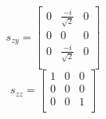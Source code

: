\documentclass[12pt]{article}
\begin{document}
\begin{equation}
s_{zy} = 
\begin{bmatrix}
0     &  \frac{-i}{\sqrt{2}} & 0 \\ 
0     & 0                    & 0 \\
0     &  \frac{-i}{\sqrt{2}} & 0 \\
\end{bmatrix}
\end{equation}
\begin{equation}
s_{zz} = 
\begin{bmatrix}
1     & 0 & 0\\
0     & 0 & 0 \\ 
0     & 0 & 1\\
\end{bmatrix}
\end{equation}
\end{document}
